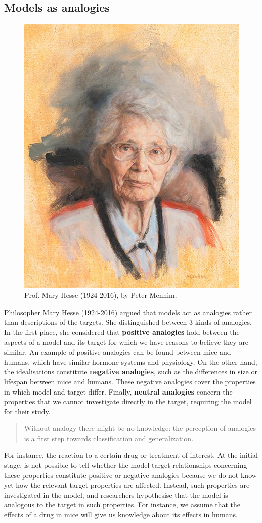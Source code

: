 \documentclass[
]{book}
\begin{document}
\hypertarget{models-as-analogies}{%
\subsection{Models as analogies}\label{models-as-analogies}}

\begin{figure}  
 \begin{center}
    \includegraphics[width=.33\textwidth]{Figures/mary-hesse.jpeg}  
  \captionsetup{labelformat=empty}
  \caption{Prof. Mary Hesse (1924-2016), by Peter Mennim.} 
\end{center}
\end{figure}
\addtocounter{figure}{-1}

Philosopher Mary Hesse (1924-2016) argued that models act as analogies rather than descriptions of the targets. She distinguished between 3 kinds of analogies. In the first place, she considered that \textbf{positive analogies} hold between the aspects of a model and its target for which we have reasons to believe they are similar. An example of positive analogies can be found between mice and humans, which have similar hormone systems and physiology. On the other hand, the idealisations constitute \textbf{negative analogies}, such as the differences in size or lifespan between mice and humans. These negative analogies cover the properties in which model and target differ. Finally, \textbf{neutral analogies} concern the properties that we cannot investigate directly in the target, requiring the model for their study.

\begin{quote}
Without analogy there might be no knowledge: the perception of analogies is a first step towards classification and generalization. \citep{bunge2012method}
\end{quote}

For instance, the reaction to a certain drug or treatment of interest. At the initial stage, is not possible to tell whether the model-target relationships concerning these properties constitute positive or negative analogies because we do not know yet how the relevant target properties are affected. Instead, such properties are investigated in the model, and researchers hypothesise that the model is analogous to the target in such properties. For instance, we assume that the effects of a drug in mice will give us knowledge about its effects in humans.
\end{document}
